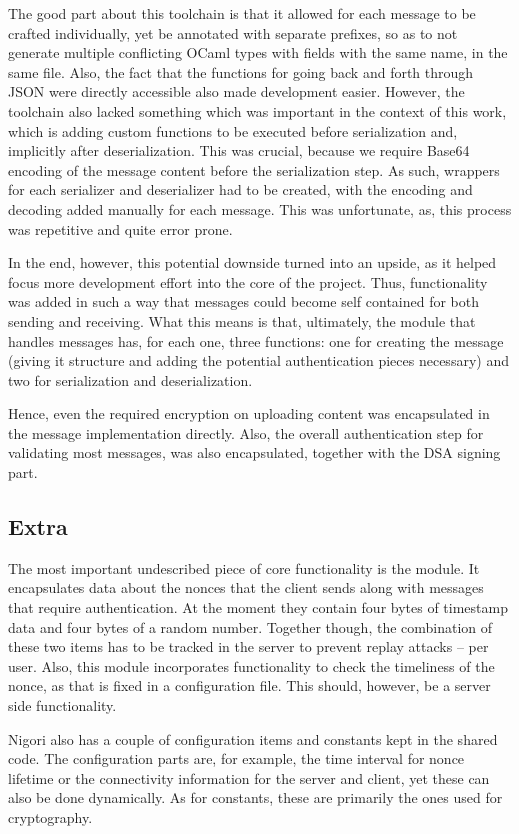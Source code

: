 The good part about this toolchain is that it allowed for each message to be crafted individually, yet be annotated with separate prefixes, so as to not generate multiple conflicting OCaml types with fields with the same name, in the same file.
Also, the fact that the functions for going back and forth through JSON were directly accessible also made development easier.
However, the toolchain also lacked something which was important in the context of this work, which is adding custom functions to be executed before serialization and, implicitly after deserialization.
This was crucial, because we require Base64 encoding of the message content before the serialization step.
As such, wrappers for each serializer and deserializer had to be created, with the encoding and decoding added manually for each message.
This was unfortunate, as, this process was repetitive and quite error prone.

In the end, however, this potential downside turned into an upside, as it helped focus more development effort into the core of the project.
Thus, functionality was added in such a way that messages could become self contained for both sending and receiving.
What this means is that, ultimately, the module that handles messages has, for each one, three functions: one for creating the message (giving it structure and adding the potential authentication pieces necessary) and two for serialization and deserialization.

Hence, even the required encryption on uploading content was encapsulated in the message implementation directly.
Also, the overall authentication step for validating most messages, was also encapsulated, together with the DSA signing part.

\subsection{Extra}
The most important undescribed piece of core functionality is the  module.
It encapsulates data about the nonces that the client sends along with messages that require authentication.
At the moment they contain four bytes of timestamp data and four bytes of a random number.
Together though, the combination of these two items has to be tracked in the server to prevent replay attacks -- per user.
Also, this module incorporates functionality to check the timeliness of the nonce, as that is fixed in a configuration file.
This should, however, be a server side functionality.

Nigori also has a couple of configuration items and constants kept in the shared code.
The configuration parts are, for example, the time interval for nonce lifetime or the connectivity information for the server and client, yet these can also be done dynamically.
As for constants, these are primarily the ones used for cryptography.

